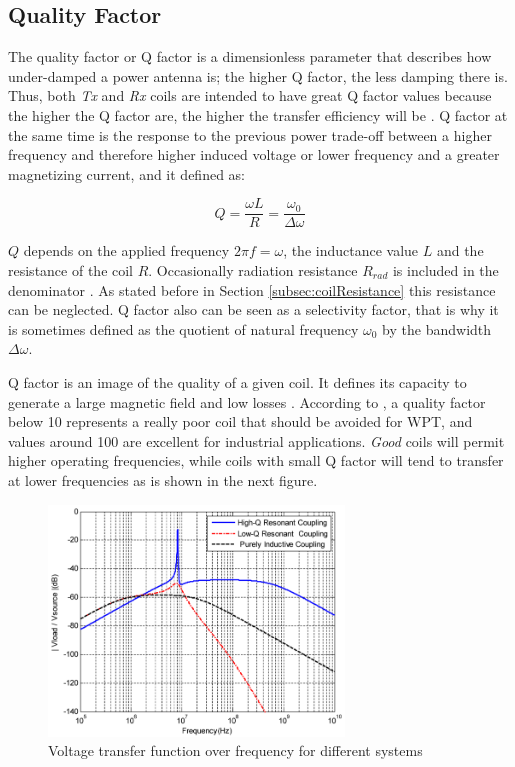 		\subsection{Quality Factor}
The quality factor or Q factor is a dimensionless parameter that describes how under-damped a power antenna is; the higher Q factor, the less damping there is. Thus, both \textit{Tx} and \textit{Rx} coils are intended to have great Q factor values because the higher the Q factor are, the higher the transfer efficiency will be \cite{medical}. Q factor at the same time is the response to the previous power trade-off between a higher frequency and therefore higher induced voltage or lower frequency and a greater magnetizing current, and it defined as:

\begin{equation}
	Q = \frac{\omega{L}}{R}=\frac{\omega_0}{\Delta{\omega}}
	\label{eq:Qfactor}
\end{equation}

$Q$ depends on the applied frequency $2\pi{f}=\omega$, the inductance value $L$ and the resistance of the coil $R$. Occasionally radiation resistance $R_{rad}$ is included in the denominator \cite{5413106}. As stated before in Section \ref{subsec:coilResistance} this resistance can be neglected. Q factor also can be seen as a selectivity factor, that is why it is sometimes defined as the quotient of natural frequency $\omega_0$ by the bandwidth $\Delta{\omega}$. 

Q factor is an image of the quality of a given coil. It defines its capacity to generate a large magnetic field and low losses \cite{meyer}. According to \cite{Consortium}, a quality factor below 10 represents a really poor coil that should be avoided for WPT, and values around 100 are excellent for industrial applications. \textit{Good} coils will permit higher operating frequencies, while coils with small Q factor will tend to transfer at lower frequencies as is shown in the next figure.

\begin{figure}[h]
\begin{center}
	\includegraphics[width=0.7\textwidth]{./images/mit2}
\caption{Voltage transfer function over frequency for different systems}
\label{F:Qfactor}
\end{center}
\end{figure}

